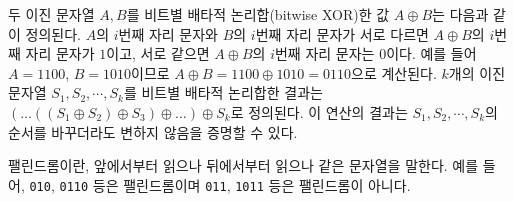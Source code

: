 두 이진 문자열 $A, B$를 비트별 배타적 논리합(bitwise XOR)한 값 $A \oplus B$는 다음과 같이 정의된다.
$A$의 $i$번째 자리 문자와 $B$의 $i$번째 자리 문자가 서로 다르면 $A \oplus B$의 $i$번째 자리 문자가 $1$이고, 서로 같으면 $A \oplus B$의 $i$번째 자리 문자는 $0$이다.
예를 들어 $A=\text{1100}$, $B=\text{1010}$이므로 $A \oplus B = \text{1100} \oplus \text{1010} = \text{0110}$으로 계산된다.
$k$개의 이진 문자열 $S_1, S_2, \cdots, S_k$를 비트별 배타적 논리합한 결과는 $(\dots((S_1 \oplus S_2) \oplus S_3) \oplus \dots) \oplus S_k$로 정의된다. 이 연산의 결과는 $S_1, S_2, \cdots, S_k$의 순서를 바꾸더라도 변하지 않음을 증명할 수 있다.

팰린드롬이란, 앞에서부터 읽으나 뒤에서부터 읽으나 같은 문자열을 말한다. 예를 들어, \texttt{010}, \texttt{0110} 등은 팰린드롬이며 \texttt{011}, \texttt{1011} 등은 팰린드롬이 아니다.